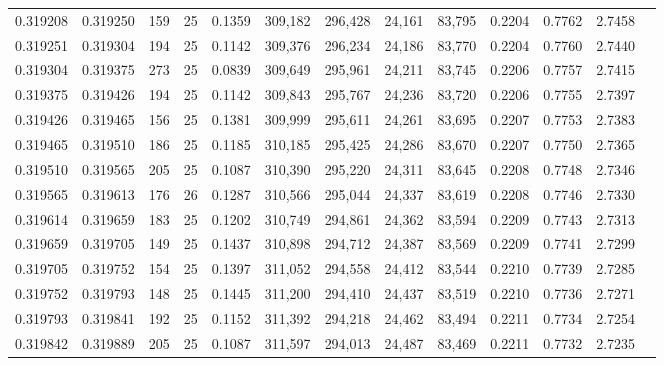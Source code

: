 \begin{tabular}{rrrrrrrrrrrrr}
0.319208 & 0.319250 &   159 &  25 &                                     0.1359 & 309,182 & 296,428 &  24,161 &  83,795 & 0.2204 & 0.7762 & 2.7458 \\
0.319251 & 0.319304 &   194 &  25 &                                     0.1142 & 309,376 & 296,234 &  24,186 &  83,770 & 0.2204 & 0.7760 & 2.7440 \\
0.319304 & 0.319375 &   273 &  25 &                                     0.0839 & 309,649 & 295,961 &  24,211 &  83,745 & 0.2206 & 0.7757 & 2.7415 \\
0.319375 & 0.319426 &   194 &  25 &                                     0.1142 & 309,843 & 295,767 &  24,236 &  83,720 & 0.2206 & 0.7755 & 2.7397 \\
0.319426 & 0.319465 &   156 &  25 &                                     0.1381 & 309,999 & 295,611 &  24,261 &  83,695 & 0.2207 & 0.7753 & 2.7383 \\
0.319465 & 0.319510 &   186 &  25 &                                     0.1185 & 310,185 & 295,425 &  24,286 &  83,670 & 0.2207 & 0.7750 & 2.7365 \\
0.319510 & 0.319565 &   205 &  25 &                                     0.1087 & 310,390 & 295,220 &  24,311 &  83,645 & 0.2208 & 0.7748 & 2.7346 \\
0.319565 & 0.319613 &   176 &  26 &                                     0.1287 & 310,566 & 295,044 &  24,337 &  83,619 & 0.2208 & 0.7746 & 2.7330 \\
0.319614 & 0.319659 &   183 &  25 &                                     0.1202 & 310,749 & 294,861 &  24,362 &  83,594 & 0.2209 & 0.7743 & 2.7313 \\
0.319659 & 0.319705 &   149 &  25 &                                     0.1437 & 310,898 & 294,712 &  24,387 &  83,569 & 0.2209 & 0.7741 & 2.7299 \\
0.319705 & 0.319752 &   154 &  25 &                                     0.1397 & 311,052 & 294,558 &  24,412 &  83,544 & 0.2210 & 0.7739 & 2.7285 \\
0.319752 & 0.319793 &   148 &  25 &                                     0.1445 & 311,200 & 294,410 &  24,437 &  83,519 & 0.2210 & 0.7736 & 2.7271 \\
0.319793 & 0.319841 &   192 &  25 &                                     0.1152 & 311,392 & 294,218 &  24,462 &  83,494 & 0.2211 & 0.7734 & 2.7254 \\
0.319842 & 0.319889 &   205 &  25 &                                     0.1087 & 311,597 & 294,013 &  24,487 &  83,469 & 0.2211 & 0.7732 & 2.7235 \\

\end{tabular}
